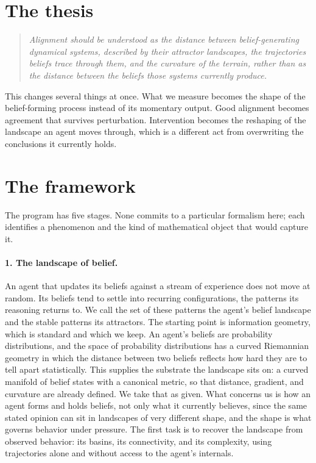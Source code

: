\documentclass[11pt,a4paper]{article}
\begin{document}
\section{The thesis}

\begin{quote}
\emph{Alignment should be understood as the distance between belief-generating
dynamical systems, described by their attractor landscapes, the trajectories
beliefs trace through them, and the curvature of the terrain, rather than as the
distance between the beliefs those systems currently produce.}
\end{quote}

This changes several things at once. What we measure becomes the shape of the
belief-forming process instead of its momentary output. Good alignment becomes
agreement that survives perturbation. Intervention becomes the reshaping of the
landscape an agent moves through, which is a different act from overwriting the
conclusions it currently holds.

\section{The framework}

The program has five stages. None commits to a particular formalism here; each
identifies a phenomenon and the kind of mathematical object that would capture
it.

\paragraph{1. The landscape of belief.}
An agent that updates its beliefs against a stream of experience does not move
at random. Its beliefs tend to settle into recurring configurations, the
patterns its reasoning returns to. We call the set of these patterns the
agent's belief landscape and the stable patterns its attractors. The starting
point is information geometry, which is standard and which we keep. An agent's
beliefs are probability distributions, and the space of probability
distributions has a curved Riemannian geometry in which the distance between
two beliefs reflects how hard they are to tell apart statistically. This
supplies the substrate the landscape sits on: a curved manifold of belief
states with a canonical metric, so that distance, gradient, and curvature are
already defined. We take that as given. What concerns us is how an agent forms
and holds beliefs, not only what it currently believes, since the same stated
opinion can sit in landscapes of very different shape, and the shape is what
governs behavior under pressure. The first task is to recover the landscape
from observed behavior: its basins, its connectivity, and its complexity, using
trajectories alone and without access to the agent's internals.
\end{document}
